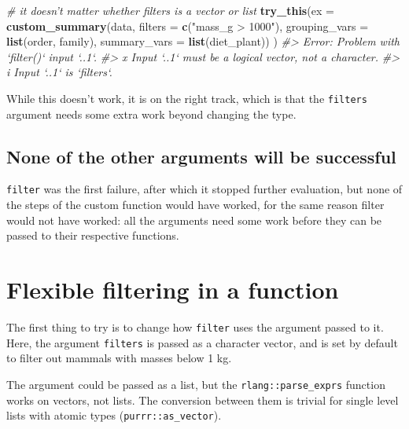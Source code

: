 \documentclass[]{book}
\newenvironment{Shaded}{}{}
\newcommand{\CommentTok}[1]{\textcolor[rgb]{0.38,0.63,0.69}{\textit{#1}}}
\newcommand{\DataTypeTok}[1]{\textcolor[rgb]{0.56,0.13,0.00}{#1}}
\newcommand{\KeywordTok}[1]{\textcolor[rgb]{0.00,0.44,0.13}{\textbf{#1}}}
\newcommand{\NormalTok}[1]{#1}
\newcommand{\StringTok}[1]{\textcolor[rgb]{0.25,0.44,0.63}{#1}}
\begin{document}
\begin{Shaded}
\begin{Highlighting}[]
\CommentTok{# it doesn't matter whether filters is a vector or list}
\KeywordTok{try_this}\NormalTok{(}\DataTypeTok{ex =} \KeywordTok{custom_summary}\NormalTok{(data,}
                   \DataTypeTok{filters =} \KeywordTok{c}\NormalTok{(}\StringTok{"mass_g > 1000"}\NormalTok{),}
                   \DataTypeTok{grouping_vars =} \KeywordTok{list}\NormalTok{(order, family),}
                   \DataTypeTok{summary_vars =} \KeywordTok{list}\NormalTok{(diet_plant))}
\NormalTok{         )}
\CommentTok{#> Error: Problem with `filter()` input `..1`.}
\CommentTok{#> x Input `..1` must be a logical vector, not a character.}
\CommentTok{#> i Input `..1` is `filters`.}
\end{Highlighting}
\end{Shaded}

While this doesn't work, it is on the right track, which is that the \texttt{filters} argument needs some extra work beyond changing the type.

\hypertarget{none-of-the-other-arguments-will-be-successful}{%
\subsection{None of the other arguments will be successful}\label{none-of-the-other-arguments-will-be-successful}}

\texttt{filter} was the first failure, after which it stopped further evaluation, but none of the steps of the custom function would have worked, for the same reason filter would not have worked: all the arguments need some work before they can be passed to their respective functions.

\hypertarget{flexible-filtering-in-a-function}{%
\section{Flexible filtering in a function}\label{flexible-filtering-in-a-function}}

The first thing to try is to change how \texttt{filter} uses the argument passed to it.
Here, the argument \texttt{filters} is passed as a character vector, and is set by default to filter out mammals with masses below 1 kg.

The argument could be passed as a list, but the \texttt{rlang::parse\_exprs} function works on vectors, not lists. The conversion between them is trivial for single level lists with atomic types (\texttt{purrr::as\_vector}).
\end{document}
